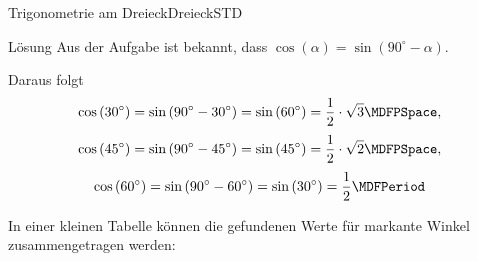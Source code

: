 \begin{MXContent}{Trigonometrie am Dreieck}{Dreieck}{STD}
\begin{MExercise}
\begin{MHint}{L\"osung}
Aus der Aufgabe  ist bekannt, dass $\cos\left(\alpha\right)= \sin\left(90^\circ-\alpha\right)$.

Daraus folgt
\[\cos\left(30^\circ\right)=\sin\left(90^\circ-30^\circ\right)=\sin\left(60^\circ\right)=\frac{1}{2}\cdot\sqrt{3} \MDFPSpace, \]
\[\cos\left(45^\circ\right)=\sin\left(90^\circ-45^\circ\right)=\sin\left(45^\circ\right)=\frac{1}{2}\cdot\sqrt{2} \MDFPSpace, \]
\[\cos\left(60^\circ\right)=\sin\left(90^\circ-60^\circ\right)=\sin\left(30^\circ\right)=\frac{1}{2} \MDFPeriod\]
\end{MHint}
\end{MExercise}

In einer kleinen Tabelle k\"onnen die gefundenen Werte f\"ur markante Winkel zusammengetragen werden:


\end{MXContent}
